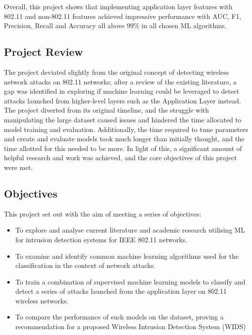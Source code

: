 Overall, this project shows that implementing application layer features with 802.11 and non-802.11 features achieved impressive performance with AUC, F1, Precision, Recall and Accuracy all above 99\% in all chosen ML algorithms. 

\subsection{Project Review}

The project deviated slightly from the original concept of detecting wireless network attacks on 802.11 networks; after a review of the existing literature, a gap was identified in exploring if machine learning could be leveraged to detect attacks launched from higher-level layers such as the Application Layer instead. The project diverted from its original timeline, and the struggle with manipulating the large dataset caused issues and hindered the time allocated to model training and evaluation. Additionally, the time required to tune parameters and create and evaluate models took much longer than initially thought, and the time allotted for this needed to be more. In light of this, a significant amount of helpful research and work was achieved, and the core objectives of this project were met.

\subsection{Objectives}

This project set out with the aim of meeting a series of objectives: 

\begin{itemize}
\item To explore and analyse current literature and academic research utilising ML for intrusion detection systems for IEEE 802.11 networks.
\end{itemize}
\begin{itemize}
\item To examine and identify common machine learning algorithms used for the classification in the context of network attacks.
\end{itemize}
\begin{itemize}
\item To train a combination of supervised machine learning models to classify and detect a series of attacks launched from the application layer on 802.11 wireless networks.
\item To compare the performance of such models on the dataset, proving a recommendation for a proposed Wireless Intrusion Detection System (WIDS)
\end{itemize}

